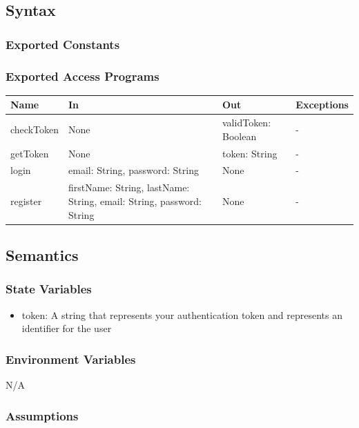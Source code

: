 \documentclass[12pt, titlepage]{article}
\begin{document}
\subsection{Syntax}

\subsubsection{Exported Constants}

\subsubsection{Exported Access Programs}

\begin{center}
\begin{tabular}{p{2cm} p{4cm} p{4cm} p{2cm}}
\hline
\textbf{Name} & \textbf{In} & \textbf{Out} & \textbf{Exceptions} \\
\hline
checkToken & None & validToken: Boolean & - \\
getToken & None & token: String & - \\
login & email: String, password: String & None & - \\
register & firstName: String, lastName: String, email: String, password: String & None & - \\
\hline
\end{tabular}
\end{center}

\subsection{Semantics}

\subsubsection{State Variables}

\begin{itemize}
  \item token: A string that represents your authentication token and represents an identifier for the user
\end{itemize}

\subsubsection{Environment Variables}

N/A

\subsubsection{Assumptions}
\end{document}
